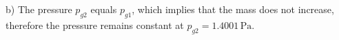 b) The pressure \( p_{g2} \) equals \( p_{g1} \), which implies that the mass does not increase, therefore the pressure remains constant at \( p_{g2} = 1.4001 \, \text{Pa} \).